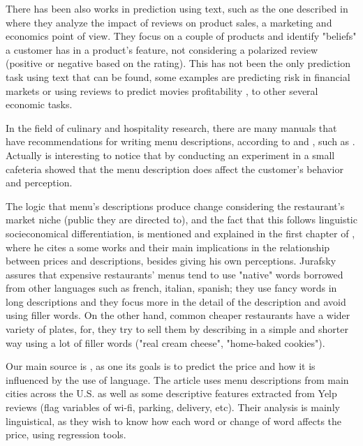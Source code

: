\documentclass[11pt,letterpaper]{article}
\begin{document}
There has been also works in prediction using text, such as the one described in \cite{archak2011deriving} where they analyze the impact of reviews on product sales, a marketing and economics point of view. They focus on a couple of products and identify "beliefs" a customer has in a product's feature, not considering a polarized review (positive or negative based on the rating). This has not been the only prediction task using text that can be found, some examples are predicting risk in financial markets or using reviews to predict movies profitability \cite{joshi2010movie}, to other several economic tasks. 

In the field of culinary and hospitality research, there are many manuals that have recommendations for writing menu descriptions, according to \cite{chahuneau2012word} and \cite{jurafsky2014language}, such as \cite{kasavana1990menu} . Actually is interesting to notice that by conducting an experiment in a small cafeteria \cite{wansink2005descriptive} showed that the menu description does affect the customer's behavior and perception.

The logic that menu's descriptions produce change considering the restaurant's market niche (public they are directed to), and the fact that this follows linguistic socieconomical differentiation, is mentioned and explained in the first chapter of \cite{jurafsky2014language}, where he cites a some works and their main implications in the relationship between prices and descriptions, besides giving his own perceptions. Jurafsky assures that expensive restaurants' menus tend to use "native" words borrowed from other languages such as french, italian, spanish; they use fancy words in long descriptions and they focus more in the detail of the description and avoid using filler words. On the other hand, common cheaper restaurants have a wider variety of plates, for, they try to sell them by describing in a simple and shorter way using a lot of filler words ("real cream cheese", "home-baked cookies"). 

Our main source is  \cite{chahuneau2012word}, as one its goals is to predict the price and how it is influenced by the use of language. The article uses menu descriptions from main cities across the U.S. as well as some descriptive features extracted from Yelp reviews (flag variables of wi-fi, parking, delivery, etc). Their analysis is mainly linguistical, as they wish to know how each word or change of word affects the price, using regression tools.
\end{document}
